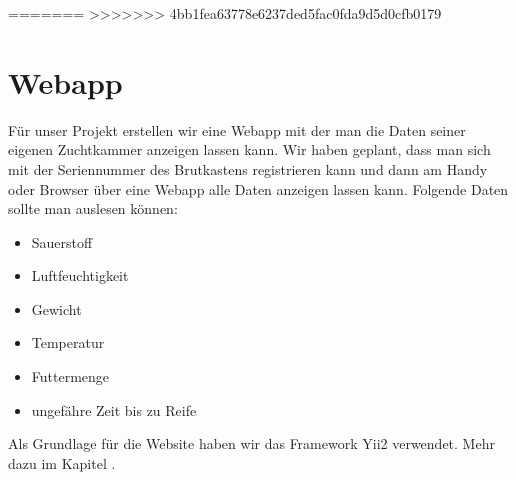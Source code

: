 =======
>>>>>>> 4bb1fea63778e6237ded5fac0fda9d5d0cfb0179

\def \currentAuthor {Florian Tipotsch}

\section{Webapp}

Für unser Projekt erstellen wir eine Webapp mit der man die Daten seiner eigenen Zuchtkammer anzeigen lassen kann.
Wir haben geplant, dass man sich mit der Seriennummer des Brutkastens registrieren kann und dann am Handy oder Browser über eine Webapp alle Daten anzeigen lassen kann. Folgende Daten sollte man auslesen können:

\begin{itemize}
	\item Sauerstoff
	\item Luftfeuchtigkeit
	\item Gewicht
	\item Temperatur
	\item Futtermenge
	\item ungefähre Zeit bis zu Reife
\end{itemize}
Als Grundlage für die Website haben wir das Framework Yii2 verwendet. Mehr dazu im Kapitel .

